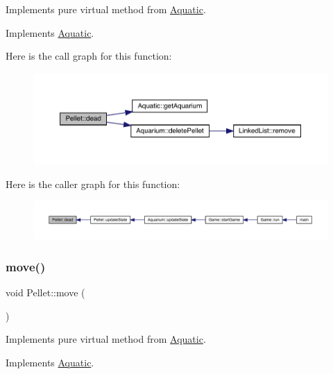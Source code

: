 Implements pure virtual method from \mbox{\hyperlink{class_aquatic}{Aquatic}}. 



Implements \mbox{\hyperlink{class_aquatic_a22fdb11e9cfec922fe50638709768276}{Aquatic}}.

Here is the call graph for this function\+:\nopagebreak
\begin{figure}[H]
\begin{center}
\leavevmode
\includegraphics[width=350pt]{class_pellet_a50bfc2589da43b06640bc5504e3c689b_cgraph}
\end{center}
\end{figure}
Here is the caller graph for this function\+:\nopagebreak
\begin{figure}[H]
\begin{center}
\leavevmode
\includegraphics[width=350pt]{class_pellet_a50bfc2589da43b06640bc5504e3c689b_icgraph}
\end{center}
\end{figure}
\mbox{\label{class_pellet_a7385101b04083be663ae465c38fd2a4d}} 
\subsubsection{\texorpdfstring{move()}{move()}}
{\footnotesize\ttfamily void Pellet\+::move (\begin{DoxyParamCaption}{ }\end{DoxyParamCaption})\hspace{0.3cm}{\ttfamily [virtual]}}



Implements pure virtual method from \mbox{\hyperlink{class_aquatic}{Aquatic}}. 



Implements \mbox{\hyperlink{class_aquatic_a962e93c804814eeaf3cea6e26698eef7}{Aquatic}}.

